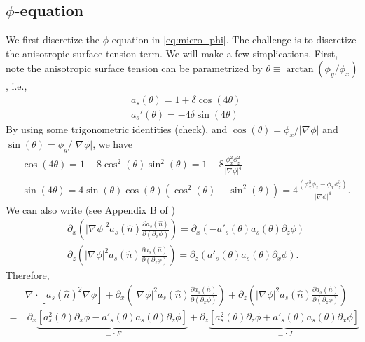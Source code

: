 \documentclass[a4paper,12pt]{article}
\renewcommand{\div}[1]{\nabla_{#1} \cdot}
\newcommand{\grad}[1]{\nabla_{#1}}
\begin{document}
\subsection{$\phi$-equation}
We first discretize the $\phi$-equation in \cref{eq:micro_phi}. The challenge is to discretize the anisotropic surface tension term. We will make a few simplications. First, note the anisotropic surface tension can be parametrized by $\theta \equiv \arctan(\phi_y / \phi_x)$, i.e., 
\begin{align}
& a_s(\theta)=  1 + \delta \cos(4 \theta) \\
& a_s'(\theta) = -4 \delta \sin(4\theta) 
\end{align}
By using some trigonometric identities (check), and $\cos(\theta) = \phi_x / |\grad{} \phi|$ and  $\sin(\theta) = \phi_y / |\grad{} \phi|$, we have
\begin{align}
& \cos(4\theta) = 1-8\cos^2(\theta) \sin^2(\theta) = 1- 8 \frac{ \phi_x^2 \phi_z^2 }{|\grad{} \phi|^4} \\
& \sin(4\theta) = 4 \sin(\theta) \cos(\theta) ( \cos^2(\theta) - \sin^2(\theta)) = 4 \frac{(\phi_x^3 \phi_z - \phi_x \phi_z^3 )}{|\grad{} \phi|^4}.
\end{align}
We can also write (see Appendix B of \cite{Tourret2015})
\begin{align}
& \partial_x \left( |\grad{} \phi|^2 a_s(\hat{n}) \frac{\partial a_s(\hat{n})}{\partial (\partial_x \phi)}  \right) = \partial_x (-a'_s(\theta) a_s(\theta) \partial_z \phi ) \\
& \partial_z \left( |\grad{} \phi|^2 a_s(\hat{n}) \frac{\partial a_s(\hat{n})}{\partial (\partial_z \phi)}  \right) = 
\partial_z (a'_s(\theta) a_s(\theta) \partial_x \phi).
\end{align}
Therefore,
\begin{align}
 & \div{} [a_s(\hat{n})^2 \grad{} \phi] +  \partial_x \left( |\grad{} \phi|^2 a_s(\hat{n}) \frac{\partial a_s(\hat{n})}{\partial (\partial_x \phi)}  \right)  +
\partial_z \left( |\grad{} \phi|^2 a_s(\hat{n}) \frac{\partial a_s(\hat{n})}{\partial (\partial_z \phi)}  \right) \nonumber \\
= &  \  \partial_x  \underbrace{ \left[ a_s^2(\theta) \partial_x \phi - a'_s(\theta) a_s(\theta) \partial_z \phi \right]}_{=: F} + 
\partial_z \underbrace{ \left[ a_s^2(\theta) \partial_z \phi + a'_s(\theta) a_s(\theta) \partial_x \phi \right]}_{=: J}  
\label{eq:aniso_surf2}
\end{align}
\end{document}
